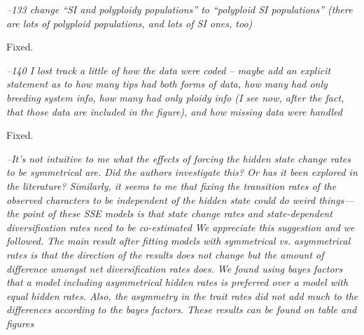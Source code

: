 \documentclass[11pt]{article}
\renewenvironment{quote}{\bigskip\noindent\itshape\ignorespaces}{\smallskip}
\begin{document}

\begin{quote}
--133 change ``SI and polyploidy populations'' to ``polyploid SI populations'' (there are lots of polyploid populations, and lots of SI ones, too)
\end{quote}

Fixed.

\begin{quote}
--140 I lost track a little of how the data were coded -- maybe add an explicit statement as to how many tips had both forms of data, how many had only breeding system info, how many had only ploidy info (I see now, after the fact, that those data are included in the figure), and how missing data were handled
\end{quote}

Fixed.

\begin{quote}
--It's not intuitive to me what the effects of forcing the hidden state change rates to be symmetrical are.
Did the authors investigate this?
Or has it been explored in the literature?
Similarly, it seems to me that fixing the transition rates of the observed characters to be independent of the hidden state could do weird things---the point of these SSE models is that state change rates and state-dependent diversification rates need to be co-estimated
\end{quote}
We appreciate this suggestion and we followed. The main result after fitting models with symmetrical vs. asymmetrical rates is that the direction of the results does not change but the amount of difference amongst net diversification rates does. We found using bayes factors that a model including asymmetrical hidden rates is preferred over a model with equal hidden rates. Also,  the asymmetry in the trait rates did not add much to the differences according to the bayes factors. These results can be found on table and figures %
\end{document}
